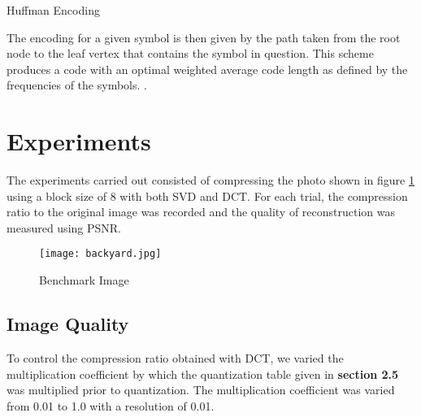 \documentclass[review,onefignum,onetabnum]{siamart190516}
\begin{document}
\begin{algorithm}
  \caption{Huffman Encoding}
  \label{alg:huffman}
  \begin{algorithmic}[1]

  \ENDWHILE
  \end{algorithmic}
\end{algorithm}

The encoding for a given symbol is then given by the path taken from the root node
to the leaf vertex that contains the symbol in question. This scheme produces a 
code with an optimal weighted average code length as defined by the frequencies of the symbols. \cite{huffman1952method}.

\section{Experiments}
The experiments carried out consisted of compressing the photo shown in figure \ref{fig:benchmark} using
a block size of 8 with both SVD and DCT. For each trial, the compression ratio
to the original image was recorded and the quality of reconstruction was measured
using PSNR.

\begin{figure}
  \centering
  \texttt{[image: backyard.jpg]}
  \caption{Benchmark Image}
  \label{fig:benchmark}
\end{figure}

\subsection{Image Quality}
To control the compression ratio obtained with DCT, we varied the multiplication
coefficient by which the quantization table given in \textbf{section 2.5} was 
multiplied prior to quantization. The multiplication coefficient was varied from 
0.01 to 1.0 with a resolution of 0.01.
\end{document}
